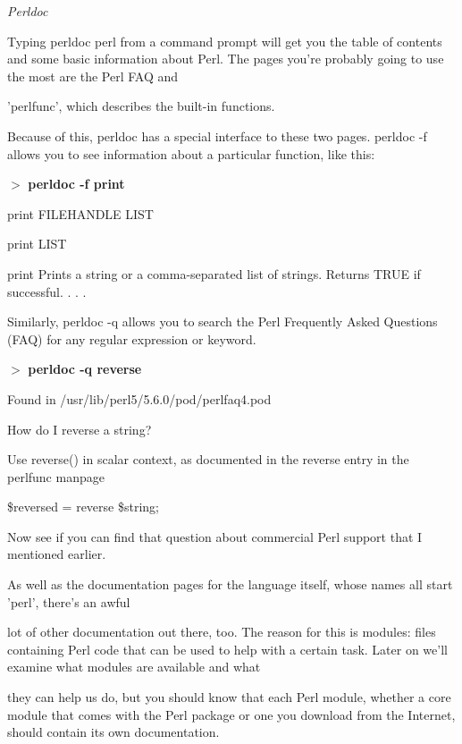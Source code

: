 \documentclass[a4paper,11pt]{book}
\begin{document}
\noindent \textit{Perldoc}

\noindent Typing perldoc perl from a command prompt will get you the table of contents and some basic information about Perl. The pages you're probably going to use the most are the Perl FAQ and

\noindent 'perlfunc', which describes the built-in functions.

\noindent 

\noindent Because of this, perldoc has a special interface to these two pages. perldoc -f allows you to see information about a particular function, like this:

\noindent 

\noindent $>$ \textbf{perldoc -f print}

\noindent print FILEHANDLE LIST

\noindent print LIST

\noindent print   Prints a string or a comma-separated list of strings.  Returns TRUE if successful. . . .

\noindent 

\noindent Similarly, perldoc -q allows you to search the Perl Frequently Asked Questions (FAQ) for any regular expression or keyword.

\noindent 

\noindent $>$ \textbf{perldoc -q reverse}

\noindent Found in /usr/lib/perl5/5.6.0/pod/perlfaq4.pod

\noindent How do I reverse a string?

\noindent Use reverse() in scalar context, as documented in the reverse entry in the perlfunc manpage

\noindent 

\noindent \$reversed = reverse \$string;

\noindent 

\noindent Now  see  if  you  can find that question  about  commercial  Perl  support  that  I  mentioned earlier.

\noindent 

\noindent As well as the documentation pages for the language itself, whose names all start 'perl', there's an awful

\noindent lot of other documentation out there, too. The reason for this is modules: files containing Perl code that can be used to help with a certain task. Later on we'll examine what modules are available and what

\noindent they can help us do, but you should know that each Perl module, whether a core module that comes with the Perl package or one you download from the Internet, should contain its own documentation.
\end{document}
